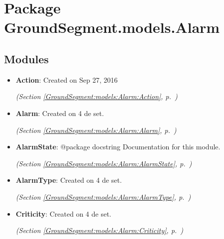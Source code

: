 %
%
%


\section{Package GroundSegment.models.Alarm}

    \label{GroundSegment:models:Alarm}


\subsection{Modules}

\begin{itemize}
\setlength{\parskip}{0ex}
\item \textbf{Action}: Created on Sep 27, 2016



  \textit{(Section \ref{GroundSegment:models:Alarm:Action}, p.~\pageref{GroundSegment:models:Alarm:Action})}

\item \textbf{Alarm}: Created on 4 de set.



  \textit{(Section \ref{GroundSegment:models:Alarm:Alarm}, p.~\pageref{GroundSegment:models:Alarm:Alarm})}

\item \textbf{AlarmState}: @package docstring Documentation for this module.



  \textit{(Section \ref{GroundSegment:models:Alarm:AlarmState}, p.~\pageref{GroundSegment:models:Alarm:AlarmState})}

\item \textbf{AlarmType}: Created on 4 de set.



  \textit{(Section \ref{GroundSegment:models:Alarm:AlarmType}, p.~\pageref{GroundSegment:models:Alarm:AlarmType})}

\item \textbf{Criticity}: Created on 4 de set.



  \textit{(Section \ref{GroundSegment:models:Alarm:Criticity}, p.~\pageref{GroundSegment:models:Alarm:Criticity})}

\end{itemize}

